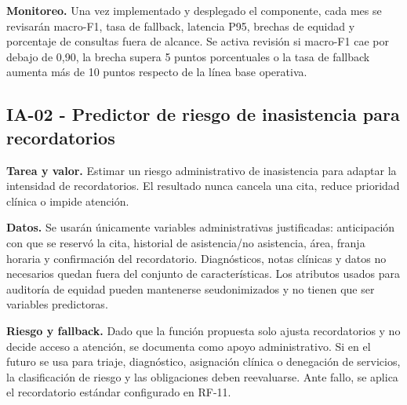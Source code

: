 \documentclass[11pt,a4paper]{article}
\begin{document}
	\textbf{Monitoreo.} Una vez implementado y desplegado el componente, cada mes se revisarán macro-F1, tasa de fallback, latencia P95, brechas de equidad y porcentaje de consultas fuera de alcance. Se activa revisión si macro-F1 cae por debajo de 0,90, la brecha supera 5 puntos porcentuales o la tasa de fallback aumenta más de 10 puntos respecto de la línea base operativa.
	
	\subsection{IA-02 - Predictor de riesgo de inasistencia para recordatorios}
	\textbf{Tarea y valor.} Estimar un riesgo administrativo de inasistencia para adaptar la intensidad de recordatorios. El resultado nunca cancela una cita, reduce prioridad clínica o impide atención.
	
	\textbf{Datos.} Se usarán únicamente variables administrativas justificadas: anticipación con que se reservó la cita, historial de asistencia/no asistencia, área, franja horaria y confirmación del recordatorio. Diagnósticos, notas clínicas y datos no necesarios quedan fuera del conjunto de características. Los atributos usados para auditoría de equidad pueden mantenerse seudonimizados y no tienen que ser variables predictoras.
	
	\textbf{Riesgo y fallback.} Dado que la función propuesta solo ajusta recordatorios y no decide acceso a atención, se documenta como apoyo administrativo. Si en el futuro se usa para triaje, diagnóstico, asignación clínica o denegación de servicios, la clasificación de riesgo y las obligaciones deben reevaluarse. Ante fallo, se aplica el recordatorio estándar configurado en RF-11.
	
\end{document}
